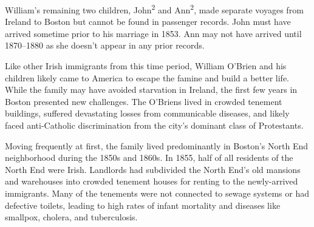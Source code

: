 William's remaining two children, John\textsuperscript{2} and Ann\textsuperscript{2}, made separate voyages from Ireland to Boston but cannot be found in passenger records. John must have arrived sometime prior to his marriage in 1853.\cite{John2OBrienCivilMarriage:1} Ann may not have arrived until 1870--1880 as she doesn't appear in any prior records.\cite{Census1880Edward:1} 

Like other Irish immigrants from this time period, William O'Brien and his children likely came to America to escape the famine and build a better life. While the family may have avoided starvation in Ireland, the first few years in Boston presented new challenges. The O'Briens lived in crowded tenement buildings, suffered devastating losses from communicable diseases, and likely faced anti-Catholic discrimination from the city's dominant class of Protestants.\cite{Ryan:61,Quinlan:58}
	
Moving frequently at first, the family lived predominantly in Boston's North End neighborhood during the 1850s and 1860s.\cite{NorthEndAddresses} In 1855, half of all residents of the North End were Irish.\cite{Todisco:29} Landlords had subdivided the North End's old mansions and warehouses into crowded tenement houses for renting to the newly-arrived immigrants.\cite{Goldfeld:102} Many of the tenements were not connected to sewage systems or had defective toilets, leading to high rates of infant mortality and diseases like smallpox, cholera, and tuberculosis.\cite{Goldfeld:103,Todisco:21,Ryan:48}


